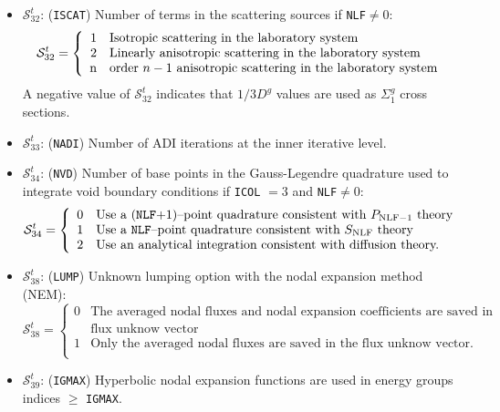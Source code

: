 \begin{itemize}
\item $\mathcal{S}^{t}_{32}$: ({\tt ISCAT}) Number of terms in the scattering sources if {\tt NLF}$\ne 0$:
\begin{displaymath}
\mathcal{S}^{t}_{32} = \left\{
\begin{array}{rl}
 1 & \textrm{Isotropic scattering in the laboratory system} \\
 2 & \textrm{Linearly anisotropic scattering in the laboratory system} \\
 $n$ & \textrm{order $n-1$ anisotropic scattering in the laboratory system}
\end{array} \right.
\end{displaymath}
\noindent A negative value of $\mathcal{S}^{t}_{32}$ indicates that $1/3D^{g}$ values are used as $\Sigma_1^{g}$ cross sections.

\item $\mathcal{S}^{t}_{33}$: ({\tt NADI}) Number of ADI iterations at the inner
iterative level.

\item $\mathcal{S}^{t}_{34}$: ({\tt NVD}) Number of base points in the Gauss-Legendre quadrature used to integrate
void boundary conditions if {\tt ICOL} $=3$ and {\tt NLF}$\ne 0$:
\begin{displaymath}
\mathcal{S}^{t}_{34} = \left\{
\begin{array}{rl}
 0 & \textrm{Use a ({\tt NLF}$+1$)--point quadrature consistent with $P_{{\rm NLF}-1}$ theory} \\
 1 & \textrm{Use a {\tt NLF}--point quadrature consistent with $S_{\rm NLF}$ theory} \\
 2 & \textrm{Use an analytical integration consistent with diffusion theory.}
\end{array} \right.
\end{displaymath}

\item $\mathcal{S}^{t}_{38}$: ({\tt LUMP}) Unknown lumping option with the nodal expansion method (NEM):
\begin{displaymath}
\mathcal{S}^{t}_{38} = \left\{
\begin{array}{rl}
 0 & \textrm{The averaged nodal fluxes and nodal expansion coefficients are saved in the} \\
   & \textrm{flux unknow vector} \\
 1 & \textrm{Only the averaged nodal fluxes are saved in the flux unknow vector.} \\
\end{array} \right.
\end{displaymath}

\item $\mathcal{S}^{t}_{39}$: ({\tt IGMAX}) Hyperbolic nodal expansion functions are used in energy groups indices $\ge$ {\tt IGMAX}.

\end{itemize}

